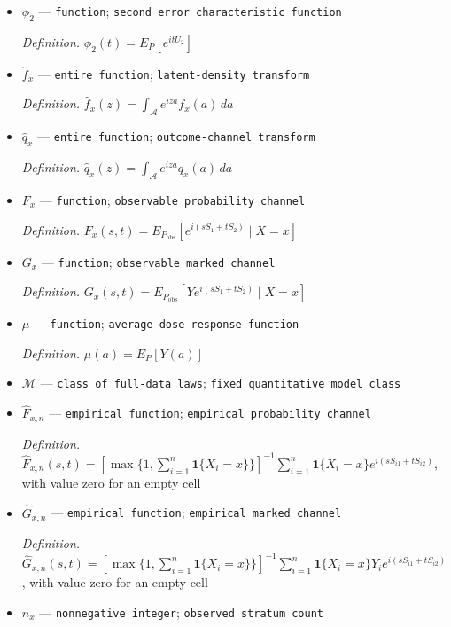 \documentclass{article}
\begin{document}
\begin{itemize}
  \item \(\phi_2\) --- \texttt{function}; \texttt{second error characteristic function}
  \par\smallskip\noindent\emph{Definition.} \(\phi_2(t)=E_P[e^{itU_2}]\)
  \item \(\widehat f_x\) --- \texttt{entire function}; \texttt{latent-\allowbreak{}density transform}
  \par\smallskip\noindent\emph{Definition.} \(\widehat f_x(z)=\int_{\mathcal A}e^{iza}f_x(a)\,da\)
  \item \(\widehat q_x\) --- \texttt{entire function}; \texttt{outcome-\allowbreak{}channel transform}
  \par\smallskip\noindent\emph{Definition.} \(\widehat q_x(z)=\int_{\mathcal A}e^{iza}q_x(a)\,da\)
  \item \(F_x\) --- \texttt{function}; \texttt{observable probability channel}
  \par\smallskip\noindent\emph{Definition.} \(F_x(s,t)=E_{P_{\mathrm{obs}}}[e^{i(sS_1+tS_2)}\mid X=x]\)
  \item \(G_x\) --- \texttt{function}; \texttt{observable marked channel}
  \par\smallskip\noindent\emph{Definition.} \(G_x(s,t)=E_{P_{\mathrm{obs}}}[Ye^{i(sS_1+tS_2)}\mid X=x]\)
  \item \(\mu\) --- \texttt{function}; \texttt{average dose-\allowbreak{}response function}
  \par\smallskip\noindent\emph{Definition.} \(\mu(a)=E_P[Y(a)]\)
  \item \(\mathcal M\) --- \texttt{class of full-\allowbreak{}data laws}; \texttt{fixed quantitative model class}
  \item \(\widehat F_{x,n}\) --- \texttt{empirical function}; \texttt{empirical probability channel}
  \par\smallskip\noindent\emph{Definition.} \(\widehat F_{x,n}(s,t)=[\max\{1,\sum_{i=1}^n\mathbf 1\{X_i=x\}\}]^{-1}\sum_{i=1}^n\mathbf 1\{X_i=x\}e^{i(sS_{i1}+tS_{i2})}\), with value zero for an empty cell
  \item \(\widehat G_{x,n}\) --- \texttt{empirical function}; \texttt{empirical marked channel}
  \par\smallskip\noindent\emph{Definition.} \(\widehat G_{x,n}(s,t)=[\max\{1,\sum_{i=1}^n\mathbf 1\{X_i=x\}\}]^{-1}\sum_{i=1}^n\mathbf 1\{X_i=x\}Y_i e^{i(sS_{i1}+tS_{i2})}\), with value zero for an empty cell
  \item \(n_x\) --- \texttt{nonnegative integer}; \texttt{observed stratum count}

\end{itemize}
\end{document}
